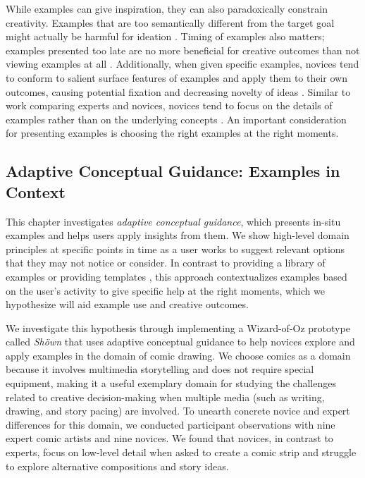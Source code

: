 While examples can give inspiration, they can also paradoxically constrain creativity. Examples that are too semantically different from the target goal might actually be harmful for ideation \cite{chan2011benefits,chan2017semantically}.  Timing of examples also matters; examples presented too late are no more beneficial for creative outcomes than not viewing examples at all \cite{kulkarni2012early,Siangliulue}. Additionally, when given specific examples, novices tend to conform to salient surface features of examples and apply them to their own outcomes, causing potential fixation and decreasing novelty of ideas \cite{jansson1991design,kulkarni2012early,marsh1996examples,Smith1993}. Similar to work comparing experts and novices, novices tend to focus on the details of examples rather than on the underlying concepts \cite{chi1981categorization}. An important consideration for presenting examples is choosing the right examples at the right moments.


\subsection{Adaptive Conceptual Guidance: Examples in Context}
This chapter investigates \emph{adaptive conceptual guidance}, which presents in-situ examples and helps users apply insights from them. We show high-level domain principles at specific points in time as a user works to suggest relevant options that they may not notice or consider. In contrast to providing a library of examples or providing templates \cite{kang2018paragon,Lee2009,marks1997design,terry2002side}, this approach contextualizes examples based on the user's activity to give specific help at the right moments, which we hypothesize will aid example use and creative outcomes. 

We investigate this hypothesis through implementing a Wizard-of-Oz prototype called \emph{Sh{\"o}wn} that uses adaptive conceptual guidance to help novices explore and apply examples in the domain of comic drawing.
We choose comics as a domain because it involves multimedia storytelling and does not require special equipment, making it a useful exemplary domain for studying the challenges related to creative decision-making when multiple media (such as writing, drawing, and story pacing) are involved. 
To unearth concrete novice and expert differences for this domain, we conducted participant observations with nine expert comic artists and nine novices. We found that novices, in contrast to experts, focus on low-level detail when asked to create a comic strip and struggle to explore alternative compositions and story ideas.

